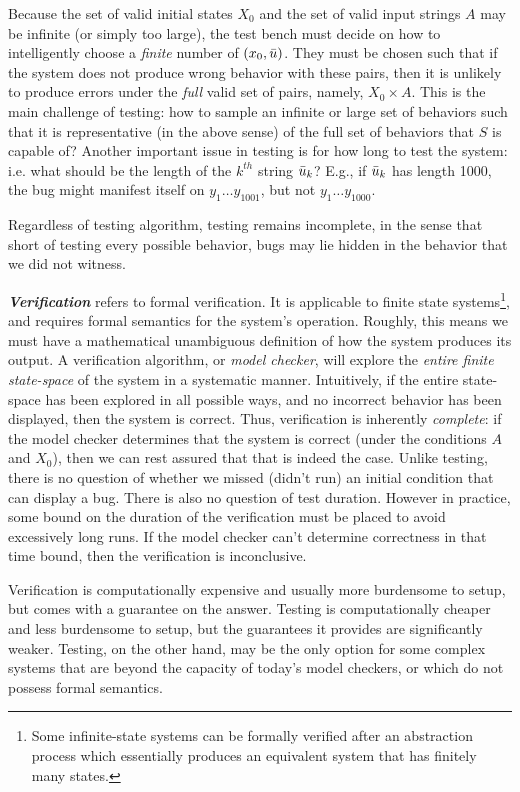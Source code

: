Because the set of valid initial states $X_0$ and the set of valid input strings $A$ may be infinite (or simply too large), the test bench must decide on how to intelligently choose a \emph{finite} number of $(x_0,\bar{u})$.
They must be chosen such that if the system does not produce wrong behavior with these pairs, then it is unlikely to produce errors under the \emph{full} valid set of pairs, namely, $X_0 \times A$.
This is the main challenge of testing: how to sample an infinite or large set of behaviors such that it is representative (in the above sense) of the full set of behaviors that $S$ is capable of?
Another important issue in testing is for how long to test the system: i.e. what should be the length of the $k^{th}$ string $\bar{u}_k$? 
E.g., if $\bar{u}_k$ has length 1000, the bug might manifest itself on $y_1\ldots y_{1001}$, but not $y_1\ldots y_{1000}$.

Regardless of testing algorithm, testing remains incomplete, in the sense that short of testing every possible behavior, bugs may lie hidden in the behavior that we did not witness.

\emph{\textbf{Verification}} refers to formal verification.
It is applicable to finite state systems\footnote{Some infinite-state systems can be formally verified after an abstraction process which essentially produces an equivalent system that has finitely many states.}, 
and requires formal semantics for the system's operation. 
Roughly, this means we must have a mathematical unambiguous definition of how the system produces its output.
A verification algorithm, or \emph{model checker}, will explore the \emph{entire finite state-space} of the system in a systematic manner. 
Intuitively, if the entire state-space has been explored in all possible ways, and no incorrect behavior has been displayed, then the system is correct. 
Thus, verification is inherently \emph{complete}: if the model checker determines that the system is correct (under the conditions $A$ and $X_0$), then we can rest assured that that is indeed the case.
Unlike testing, there is no question of whether we missed (didn't run) an initial condition that can display a bug.
There is also no question of test duration.
However in practice, some bound on the duration of the verification must be placed to avoid excessively long runs. 
If the model checker can't determine correctness in that time bound, then the verification is inconclusive.

Verification is computationally expensive and usually more burdensome to setup, but comes with a guarantee on the answer. 
Testing is computationally cheaper and less burdensome to setup, but the guarantees it provides are significantly weaker.
Testing, on the other hand, may be the only option for some complex systems that are beyond the capacity of today's model checkers, or which do not possess formal semantics.

